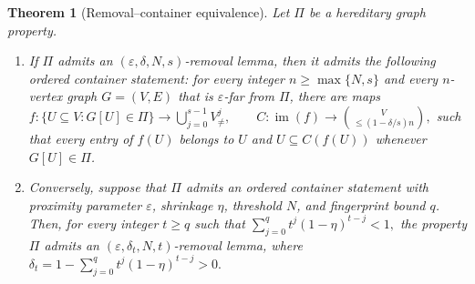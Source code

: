 \documentclass[10pt,a4paper]{amsart}
\newtheorem{thm}{Theorem}
\begin{document}
\begin{thm}[Removal--container equivalence]\label{thm:removal-container-equivalence}
Let $\Pi$ be a hereditary graph property.
\begin{enumerate}
\item If $\Pi$ admits an $(\varepsilon,\delta,N,s)$-removal lemma, then it
admits the following ordered container statement: for every integer
$n\geq\max\{N,s\}$ and every $n$-vertex graph $G=(V,E)$ that is
$\varepsilon$-far from $\Pi$, there are maps
\(f:\{U\subseteq V:G[U]\in\Pi\} \longrightarrow \bigcup_{j=0}^{s-1}V_{\neq}^{j}, \qquad C:\operatorname{im}(f) \longrightarrow \binom{V}{\leq(1-\delta/s)n},\)
such that every entry of $f(U)$ belongs to $U$ and
$U\subseteq C(f(U))$ whenever $G[U]\in\Pi$.

\item Conversely, suppose that $\Pi$ admits an ordered container statement
with proximity parameter $\varepsilon$, shrinkage $\eta$, threshold $N$,
and fingerprint bound $q$.  Then, for every integer $t\geq q$ such that
\(\sum_{j=0}^{q}t^j(1-\eta)^{t-j}<1,\)
the property $\Pi$ admits an $(\varepsilon,\delta_t,N,t)$-removal lemma,
where
\(\delta_t=1-\sum_{j=0}^{q}t^j(1-\eta)^{t-j}>0.\)
\end{enumerate}
\end{thm}
\end{document}
